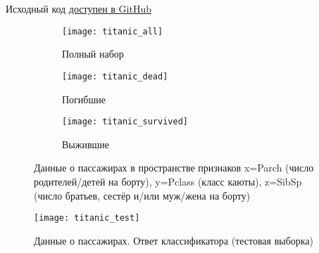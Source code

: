 \documentclass[a4paper,12pt]{article} %
\newcommand{\myPictWidth}{.95\textwidth}
\begin{document}
Исходный код \href{https://github.com/zuevval/source/blob/master/r/ml/lab1bayes/task3_titanic.R}{доступен в GitHub}

\begin{figure}[H]
	\centering
	\begin{subfigure}{.3\textwidth}
		\centering
		\texttt{[image: titanic\_all]}
		\caption{Полный набор}
		\label{fig:titanic_all}
	\end{subfigure}%
	\begin{subfigure}{.3\textwidth}
		\centering
		\texttt{[image: titanic\_dead]}
		\caption{Погибшие}
		\label{fig:titanic_survived}
	\end{subfigure}%
	\begin{subfigure}{.3\textwidth}
		\centering
		\texttt{[image: titanic\_survived]}
		\caption{Выжившие}
		\label{fig:titanic_dead}
	\end{subfigure}
	\caption{Данные о пассажирах в пространстве признаков x=Parch (число родителей/детей на борту), y=Pclass (класс каюты), z=SibSp (число братьев, сестёр и/или муж/жена на борту)}
\end{figure}

\begin{figure}[H]
	\centering
	\texttt{[image: titanic\_test]}
	\caption{Данные о пассажирах. Ответ классификатора (тестовая выборка)}
	\label{fig:titanic_test}
\end{figure}
	
	
\end{document}
